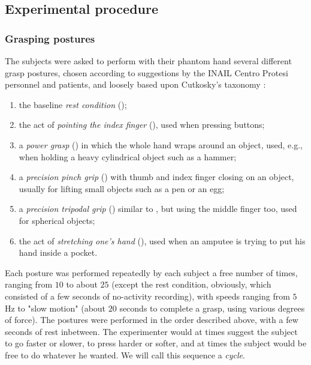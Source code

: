 \subsection{Experimental procedure}

\subsubsection{Grasping postures}

The subjects were asked to perform with their phantom hand several
different grasp postures, chosen according to suggestions by the
INAIL Centro Protesi personnel and patients, and loosely based upon
Cutkosky's taxonomy \cite{cutkosky}:

\begin{enumerate}

  \item the baseline \emph{rest condition} (\re);

  \item the act of \emph{pointing the index finger} (\po), used when pressing buttons;

	\item a \emph{power grasp} (\pw) in which the whole hand wraps around an object,
		used, e.g., when holding a heavy cylindrical object such as a hammer;
		
	\item a \emph{precision pinch grip} (\pi) with thumb and index finger closing on
	 	an object, usually for lifting small objects such as a pen or an egg;
	
	\item a \emph{precision tripodal grip} (\tr) similar to \pi, but using the
		middle finger too, used for spherical objects;
		
	\item the act of \emph{stretching one's hand} (\hs), used when an amputee is trying
		to put his hand inside a pocket. 

\end{enumerate}
	
Each posture was performed repeatedly by each subject a free number of times,
ranging from $10$ to about $25$ (except the rest condition, obviously, which consisted
of a few seconds of no-activity recording), with speeds ranging from $5$Hz to
"slow motion" (about $20$ seconds to complete a grasp, using various degrees of
force). The postures were performed in the order described
above, with a few seconds of rest inbetween. The
experimenter would at times suggest the subject to go faster or slower, to press
harder or softer, and at times the subject would be free to do whatever he wanted.
We will call this sequence a \emph{cycle}.

